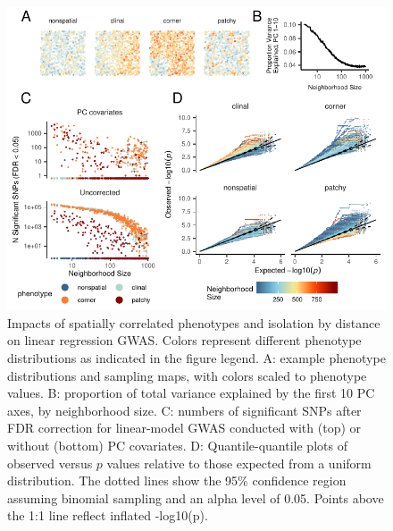 \documentclass[9pt,twocolumn,twoside,lineno]{gsajnl}
\begin{document}
\afterpage{\clearpage}
\begin{figure}[p]
\centering
\includegraphics[width=\textwidth]{gwas_summary_nsig_qqplots_loglog.pdf}
\caption{Impacts of spatially correlated phenotypes and isolation by distance on linear regression GWAS. Colors represent different phenotype distributions as indicated in the figure legend. A: example phenotype distributions and sampling maps, with colors scaled to phenotype values. B: proportion of total variance explained by the first 10 PC axes, by neighborhood size. C: numbers of significant SNPs after FDR correction for linear-model GWAS conducted with (top) or without (bottom) PC covariates. D: Quantile-quantile plots of observed versus $p$ values relative to those expected from a uniform distribution. The dotted lines show the 95\% confidence region assuming binomial sampling and an alpha level of 0.05. Points above the 1:1 line reflect inflated -log10(p).}
\label{fig:spectrum}
\end{figure}

\afterpage{\clearpage}


\end{document}
